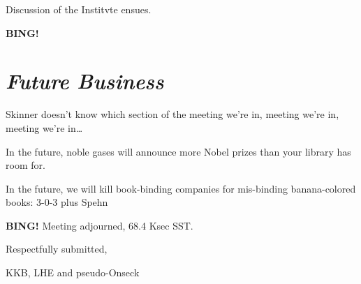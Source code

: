 \documentclass[10pt]{article}
\newcommand{\bing}{{\bf BING!} }
\newcommand{\goto}[1]{\bing \vskip 12pt \section*{{\em{#1}}}}
\newcommand{\ps}{ plus Spehn\xspace}
\newcommand{\onseck}{KKB, LHE and pseudo-Onseck}
\begin{document}
Discussion of the Institvte ensues.

\goto{Future Business}

Skinner doesn't know which section of the meeting we're in, meeting we're
in, meeting we're in\ldots

In the future, noble gases will announce more Nobel prizes than your library has room for.

In the future, we will kill book-binding companies for mis-binding banana-colored books: 3-0-3 \ps

\bing
\noindent
Meeting adjourned, 68.4 Ksec SST.

\vspace{18pt}

\centerline{Respectfully submitted,}
\centerline{\onseck}
\end{document}
